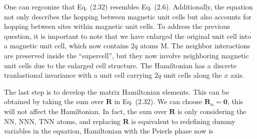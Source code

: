\documentclass{report}
\begin{document}
One can regconize that Eq. (2.32) resembles Eq. (2.6). Additionally, the equation not only describes the hopping between magnetic unit cells but also accounts for hopping between sites within magnetic unit cells. To address the previous question, it is important to note that we have enlarged the original unit cell into a magnetic unit cell, which now contains $2q$ atoms M. The neighbor interactions are preserved inside the ``supercell'', but they now involve neighboring magnetic unit cells due to the enlarged cell structure. The Hamiltonian has a discrete tranlastional invariance with a unit cell carrying $2q$ unit cells along the $x$ axis.

The last step is to develop the matrix Hamiltonian elements. This can be obtained by taking the sum over $\mathbf{R}$ in Eq. (2.32).
We can choose $\mathbf{R}_{\alpha} = \mathbf{0}$, this will not affect the Hamiltonian. In fact, the sum over $\mathbf{R}$ is only considering the \ac{NN}, \ac{NNN}, \ac{TNN} atoms, and replacing $\mathbf{R}$ is equivalent to redefining dummy variables in the equation, Hamiltonian with the Peierls phase now is
\end{document}
